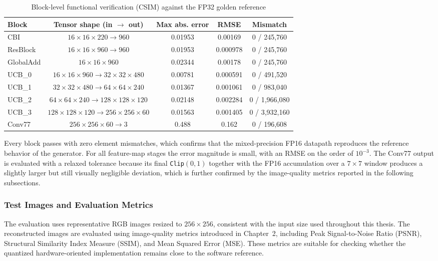 \begin{table}[H]
\centering
\caption{Block-level functional verification (CSIM) against the FP32 golden reference}
\label{tab:csim_verification}
\small
\renewcommand{\arraystretch}{1.2}
\begin{tabular}{|l|c|c|c|c|}
\hline
\textbf{Block} & \textbf{Tensor shape (in $\rightarrow$ out)} & \textbf{Max abs. error} & \textbf{RMSE} & \textbf{Mismatch} \\
\hline
CBI & $16\times16\times220 \rightarrow 960$ & 0.01953 & 0.00169 & 0 / 245,760 \\
\hline
ResBlock & $16\times16\times960 \rightarrow 960$ & 0.01953 & 0.000978 & 0 / 245,760 \\
\hline
GlobalAdd & $16\times16\times960$ & 0.02344 & 0.00178 & 0 / 245,760 \\
\hline
UCB\_0 & $16\times16\times960 \rightarrow 32\times32\times480$ & 0.00781 & 0.000591 & 0 / 491,520 \\
\hline
UCB\_1 & $32\times32\times480 \rightarrow 64\times64\times240$ & 0.01367 & 0.001061 & 0 / 983,040 \\
\hline
UCB\_2 & $64\times64\times240 \rightarrow 128\times128\times120$ & 0.02148 & 0.002284 & 0 / 1,966,080 \\
\hline
UCB\_3 & $128\times128\times120 \rightarrow 256\times256\times60$ & 0.01563 & 0.001405 & 0 / 3,932,160 \\
\hline
Conv77 & $256\times256\times60 \rightarrow 3$ & 0.488 & 0.162 & 0 / 196,608 \\
\hline
\end{tabular}
\end{table}

Every block passes with zero element mismatches, which confirms that the mixed-precision FP16 datapath reproduces the reference behavior of the generator. For all feature-map stages the error magnitude is small, with an RMSE on the order of $10^{-3}$. The Conv77 output is evaluated with a relaxed tolerance because its final \texttt{Clip}$(0,1)$ together with the FP16 accumulation over a $7\times7$ window produces a slightly larger but still visually negligible deviation, which is further confirmed by the image-quality metrics reported in the following subsections.

\subsubsection{Test Images and Evaluation Metrics}

The evaluation uses representative RGB images resized to $256 \times 256$, consistent with the input size used throughout this thesis. The reconstructed images are evaluated using image-quality metrics introduced in Chapter~2, including Peak Signal-to-Noise Ratio (PSNR), Structural Similarity Index Measure (SSIM), and Mean Squared Error (MSE). These metrics are suitable for checking whether the quantized hardware-oriented implementation remains close to the software reference.

